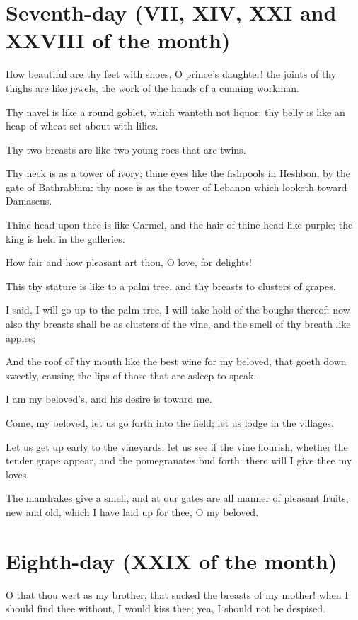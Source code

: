 \section*{Seventh-day (VII, XIV, XXI and XXVIII of the month)}

How beautiful are thy feet with shoes, O prince's daughter! the joints of thy thighs are like jewels, the work of the hands of a cunning workman.

Thy navel is like a round goblet, which wanteth not liquor: thy belly is like an heap of wheat set about with lilies.

Thy two breasts are like two young roes that are twins.

Thy neck is as a tower of ivory; thine eyes like the fishpools in Heshbon, by the gate of Bathrabbim: thy nose is as the tower of Lebanon which looketh toward Damascus.

Thine head upon thee is like Carmel, and the hair of thine head like purple; the king is held in the galleries.

How fair and how pleasant art thou, O love, for delights!

This thy stature is like to a palm tree, and thy breasts to clusters of grapes.

I said, I will go up to the palm tree, I will take hold of the boughs thereof: now also thy breasts shall be as clusters of the vine, and the smell of thy breath like apples;

And the roof of thy mouth like the best wine for my beloved, that goeth down sweetly, causing the lips of those that are asleep to speak.

I am my beloved's, and his desire is toward me.

Come, my beloved, let us go forth into the field; let us lodge in the villages.

Let us get up early to the vineyards; let us see if the vine flourish, whether the tender grape appear, and the pomegranates bud forth: there will I give thee my loves.

The mandrakes give a smell, and at our gates are all manner of pleasant fruits, new and old, which I have laid up for thee, O my beloved.

\section*{Eighth-day (XXIX of the month)}

O that thou wert as my brother, that sucked the breasts of my mother! when I should find thee without, I would kiss thee; yea, I should not be despised.


